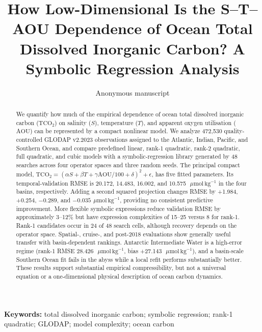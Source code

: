 \documentclass[11pt,a4paper]{article}
\title{How Low-Dimensional Is the S--T--AOU Dependence of Ocean Total Dissolved Inorganic Carbon? A Symbolic Regression Analysis}
\author{Anonymous manuscript}
\date{}
\newcommand{\tco}{\mathrm{TCO_2}}
\newcommand{\aou}{\mathrm{AOU}}
\newcommand{\umol}{\,\mu\mathrm{mol}\,\mathrm{kg}^{-1}}
\begin{document}
\maketitle

\begin{abstract}
We quantify how much of the empirical dependence of ocean total dissolved inorganic carbon ($\tco$) on salinity ($S$), temperature ($T$), and apparent oxygen utilisation ($\aou$) can be represented by a compact nonlinear model. We analyze 472,530 quality-controlled GLODAP v2.2023 observations assigned to the Atlantic, Indian, Pacific, and Southern Ocean, and compare predefined linear, rank-1 quadratic, rank-2 quadratic, full quadratic, and cubic models with a symbolic-regression library generated by 48 searches across four operator spaces and three random seeds. The principal compact model, $\tco=(\alpha S+\beta T+\gamma\aou/100+\delta)^2+\epsilon$, has five fitted parameters. Its temporal-validation RMSE is 20.172, 14.483, 16.002, and 10.575~$\umol$ in the four basins, respectively. Adding a second squared projection changes RMSE by +1.984, +0.254, $-0.289$, and $-0.035~\umol$, providing no consistent predictive improvement. More flexible symbolic expressions reduce validation RMSE by approximately 3--12\% but have expression complexities of 15--25 versus 8 for rank-1. Rank-1 candidates occur in 24 of 48 search cells, although recovery depends on the operator space. Spatial-, cruise-, and post-2018 evaluations show generally useful transfer with basin-dependent rankings. Antarctic Intermediate Water is a high-error regime (rank-1 RMSE 28.426~$\umol$, bias +27.143~$\umol$), and a basin-scale Southern Ocean fit fails in the abyss while a local refit performs substantially better. These results support substantial empirical compressibility, but not a universal equation or a one-dimensional physical description of ocean carbon dynamics.
\end{abstract}

\noindent\textbf{Keywords:} total dissolved inorganic carbon; symbolic regression; rank-1 quadratic; GLODAP; model complexity; ocean carbon











\end{document}
